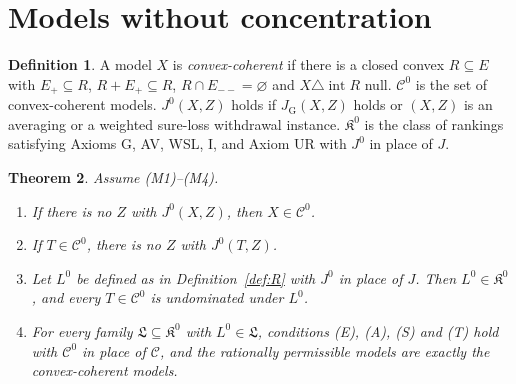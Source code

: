 \documentclass[11pt]{article}
\newtheorem{theorem}{Theorem}[section]
\theoremstyle{definition}
\newtheorem{definition}[theorem]{Definition}
\newcommand{\C}{\mathcal C}
\newcommand{\K}{\mathfrak K}
\newcommand{\Lf}{\mathfrak L}
\newcommand{\interior}{\operatorname{int}}
\newcommand{\GU}{\mathrm{G}}
\begin{document}
\section{Models without concentration}\label{sec:convex}

\begin{definition}\label{def:convex-coherent}
A model $X$ is \emph{convex-coherent} if there is a closed convex $R\subseteq E$ with $E_+\subseteq R$, $R+E_+\subseteq R$, $R\cap E_{--}=\varnothing$ and $X\triangle\interior R$ null. $\C^0$ is the set of convex-coherent models. $J^0(X,Z)$ holds if $J_\GU(X,Z)$ holds or $(X,Z)$ is an averaging or a weighted sure-loss withdrawal instance. $\K^0$ is the class of rankings satisfying Axioms G, AV, WSL, I, and Axiom UR with $J^0$ in place of $J$.
\end{definition}

\begin{theorem}\label{thm:convex}
Assume (M1)--(M4).
\begin{enumerate}[label=(\alph*)]
\item If there is no $Z$ with $J^0(X,Z)$, then $X\in\C^0$.
\item If $T\in\C^0$, there is no $Z$ with $J^0(T,Z)$.
\item Let $L^0$ be defined as in Definition~\ref{def:R} with $J^0$ in place of $J$. Then $L^0\in\K^0$, and every $T\in\C^0$ is undominated under $L^0$.
\item For every family $\Lf\subseteq\K^0$ with $L^0\in\Lf$, conditions (E), (A), (S) and (T) hold with $\C^0$ in place of $\C$, and the rationally permissible models are exactly the convex-coherent models.
\end{enumerate}
\end{theorem}
\end{document}
